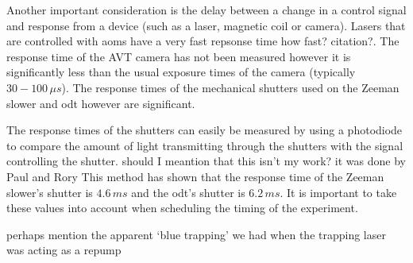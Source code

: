 Another important consideration is the delay between a change in a control signal and response from a device (such as a laser, magnetic coil or camera). Lasers that are controlled with \glspl{aom} have a very fast repsonse time {\color{red} how fast? citation?}. The response time of the AVT camera has not been measured however it is significantly less than the usual exposure times of the camera (typically $30-100\,\unit{\mu s}$). The response times of the mechanical shutters used on the Zeeman slower and \gls{odt} however are significant.

The response times of the shutters can easily be measured by using a photodiode to compare the amount of light transmitting through the shutters with the signal controlling the shutter. {\color{red} should I meantion that this isn't my work? it was done by Paul and Rory} This method has shown that the response time of the Zeeman slower's shutter is $4.6\,\unit{ms}$ and the \gls{odt}'s shutter is $6.2\,\unit{ms}$. It is important to take these values into account when scheduling the timing of the experiment.

{\color{red} perhaps mention the apparent `blue trapping' we had when the trapping laser was acting as a repump}
